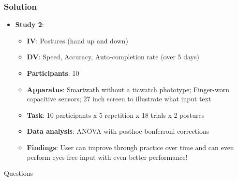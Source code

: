 \documentclass{beamer}
\begin{document}
%		

\begin{frame}
	\frametitle{Solution}
	\begin{itemize}
		\item \textbf{Study 2}:
		\begin{itemize}
			\item \textbf{IV}: Postures (hand up and down) 
			\item \textbf{DV}: Speed, Accuracy, Auto-completion rate (over 5 days)
			\item \textbf{Participants}: 10
			\item \textbf{Apparatus}: Smartwath without a ticwatch phototype; Finger-worn capacitive sensors; 27 inch screen to illustrate what input text 
			\item \textbf{Task}: 10 participants x 5 repetition x 18 trials x 2 postures
			\item \textbf{Data analysis}: ANOVA with posthoc bonferroni corrections
			\item \textbf{Findings}: User can improve through practice over time and can even perform eyes-free input with even better performance!
		\end{itemize}
	\end{itemize}
\end{frame}

\begin{frame}
\Huge{\centerline{Questions}}
\end{frame}

\end{document}
